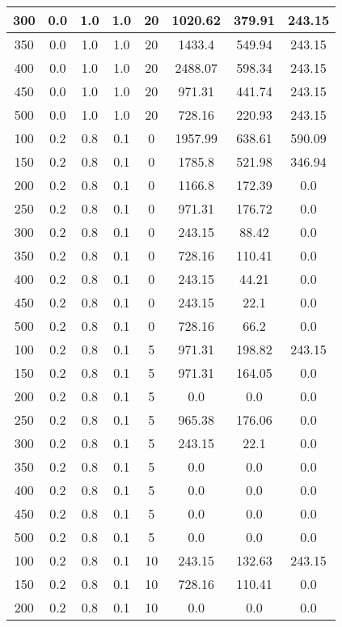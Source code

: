 \documentclass[a4paper, 12pt]{extreport}
\begin{document}
\begin{itemize}
\begin{longtable}{|c|c|c|c|c|c|c|c|}
			300 & 0.0 & 1.0 & 1.0 & 20 & 1020.62 & 379.91 & 243.15 \\\hline
			350 & 0.0 & 1.0 & 1.0 & 20 & 1433.4 & 549.94 & 243.15 \\\hline
			400 & 0.0 & 1.0 & 1.0 & 20 & 2488.07 & 598.34 & 243.15 \\\hline
			450 & 0.0 & 1.0 & 1.0 & 20 & 971.31 & 441.74 & 243.15 \\\hline
			500 & 0.0 & 1.0 & 1.0 & 20 & 728.16 & 220.93 & 243.15 \\\hline
			100 & 0.2 & 0.8 & 0.1 & 0 & 1957.99 & 638.61 & 590.09 \\\hline
			150 & 0.2 & 0.8 & 0.1 & 0 & 1785.8 & 521.98 & 346.94 \\\hline
			200 & 0.2 & 0.8 & 0.1 & 0 & 1166.8 & 172.39 & 0.0 \\\hline
			250 & 0.2 & 0.8 & 0.1 & 0 & 971.31 & 176.72 & 0.0 \\\hline
			300 & 0.2 & 0.8 & 0.1 & 0 & 243.15 & 88.42 & 0.0 \\\hline
			350 & 0.2 & 0.8 & 0.1 & 0 & 728.16 & 110.41 & 0.0 \\\hline
			400 & 0.2 & 0.8 & 0.1 & 0 & 243.15 & 44.21 & 0.0 \\\hline
			450 & 0.2 & 0.8 & 0.1 & 0 & 243.15 & 22.1 & 0.0 \\\hline
			500 & 0.2 & 0.8 & 0.1 & 0 & 728.16 & 66.2 & 0.0 \\\hline
			100 & 0.2 & 0.8 & 0.1 & 5 & 971.31 & 198.82 & 243.15 \\\hline
			150 & 0.2 & 0.8 & 0.1 & 5 & 971.31 & 164.05 & 0.0 \\\hline
			200 & 0.2 & 0.8 & 0.1 & 5 & 0.0 & 0.0 & 0.0 \\\hline
			250 & 0.2 & 0.8 & 0.1 & 5 & 965.38 & 176.06 & 0.0 \\\hline
			300 & 0.2 & 0.8 & 0.1 & 5 & 243.15 & 22.1 & 0.0 \\\hline
			350 & 0.2 & 0.8 & 0.1 & 5 & 0.0 & 0.0 & 0.0 \\\hline
			400 & 0.2 & 0.8 & 0.1 & 5 & 0.0 & 0.0 & 0.0 \\\hline
			450 & 0.2 & 0.8 & 0.1 & 5 & 0.0 & 0.0 & 0.0 \\\hline
			500 & 0.2 & 0.8 & 0.1 & 5 & 0.0 & 0.0 & 0.0 \\\hline
			100 & 0.2 & 0.8 & 0.1 & 10 & 243.15 & 132.63 & 243.15 \\\hline
			150 & 0.2 & 0.8 & 0.1 & 10 & 728.16 & 110.41 & 0.0 \\\hline
			200 & 0.2 & 0.8 & 0.1 & 10 & 0.0 & 0.0 & 0.0 \\\hline

\end{longtable}
\end{itemize}
\end{document}
